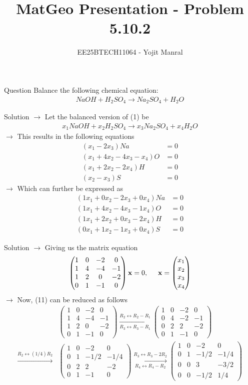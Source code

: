 \documentclass{beamer}
\title{MatGeo Presentation - Problem 5.10.2}
\author{EE25BTECH11064 - Yojit Manral}
\date{}
\numberwithin{equation}{section}
\theoremstyle{remark}
\newcommand{\myvec}[1]{\ensuremath{\begin{pmatrix}#1\end{pmatrix}}}
\let\vec\mathbf
\begin{document}
\frame{\titlepage}
\begin{frame}{Question}
Balance the following chemical equation:
\begin{align}
    NaOH + H_2SO_4 \rightarrow Na_2SO_4 + H_2O
\end{align}
\end{frame}

\begin{frame}{Solution}
$\rightarrow$ Let the balanced version of (1) be
\begin{align}
    x_1NaOH + x_2H_2SO_4 \rightarrow x_3Na_2SO_4 + x_4H_2O
\end{align}
$\rightarrow$ This results in the following equations
\begin{align}
    (x_1 - 2x_3)Na &= 0 \\
    (x_1 + 4x_2 - 4x_3 - x_4)O &= 0 \\
    (x_1 + 2x_2 - 2x_4)H &= 0 \\
    (x_2 - x_3)S &= 0
\end{align}
$\rightarrow$ Which can further be expressed as
\begin{align}
    (1x_1 + 0x_2 - 2x_3 + 0x_4)Na &= 0 \\
    (1x_1 + 4x_2 - 4x_3 - 1x_4)O &= 0 \\
    (1x_1 + 2x_2 + 0x_3 - 2x_4)H &= 0 \\
    (0x_1 + 1x_2 - 1x_3 + 0x_4)S &= 0
\end{align}
\end{frame}

\begin{frame}{Solution}
$\rightarrow$ Giving us the matrix equation
\begin{align}
    \myvec{1&0&-2&0\\1&4&-4&-1\\1&2&0&-2\\0&1&-1&0}\vec{x} = 0, \hspace{0.5cm} \vec{x} = \myvec{x_1\\x_2\\x_3\\x_4}
\end{align}
$\rightarrow$ Now, (11) can be reduced as follows
\begin{align}
&\myvec{1&0&-2&0\\1&4&-4&-1\\1&2&0&-2\\0&1&-1&0}\xrightarrow[R_3 \leftrightarrow R_3 - R_1]{R_2 \leftrightarrow R_2 - R_1}\myvec{1&0&-2&0\\0&4&-2&-1\\0&2&2&-2\\0&1&-1&0} \\
\xrightarrow{R_2 \leftrightarrow (1/4)R_2}&\myvec{1&0&-2&0\\0&1&-1/2&-1/4\\0&2&2&-2\\0&1&-1&0}\xrightarrow[R_4 \leftrightarrow R_4 - R_2]{R_3 \leftrightarrow R_3 - 2R_2}\myvec{1&0&-2&0\\0&1&-1/2&-1/4\\0&0&3&-3/2\\0&0&-1/2&1/4}
\end{align}
\end{frame}
\end{document}
